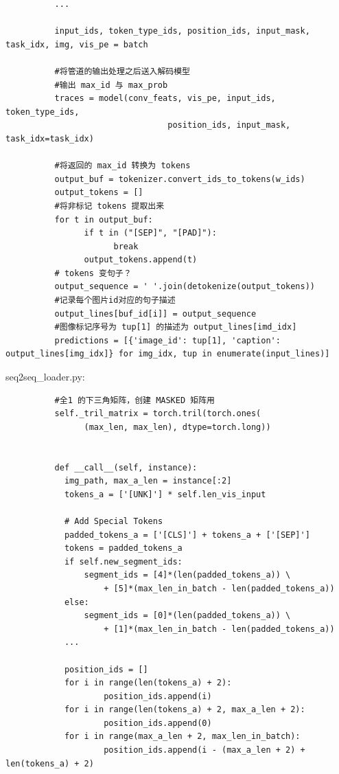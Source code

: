 \documentclass[a4paper]{article}
\begin{document}
\begin{sloppypar}
\begin{lstlisting}
          ...

          input_ids, token_type_ids, position_ids, input_mask, task_idx, img, vis_pe = batch

          #将管道的输出处理之后送入解码模型
          #输出 max_id 与 max_prob
          traces = model(conv_feats, vis_pe, input_ids, token_type_ids,
                                 position_ids, input_mask, task_idx=task_idx)
          
          #将返回的 max_id 转换为 tokens
          output_buf = tokenizer.convert_ids_to_tokens(w_ids)
          output_tokens = []
          #将非标记 tokens 提取出来
          for t in output_buf:
                if t in ("[SEP]", "[PAD]"):
                      break
                output_tokens.append(t)
          # tokens 变句子？
          output_sequence = ' '.join(detokenize(output_tokens))
          #记录每个图片id对应的句子描述
          output_lines[buf_id[i]] = output_sequence
          #图像标记序号为 tup[1] 的描述为 output_lines[imd_idx]
          predictions = [{'image_id': tup[1], 'caption': output_lines[img_idx]} for img_idx, tup in enumerate(input_lines)]
          \end{lstlisting}



    \newpage

    seq2seq\_loader.py:
    \begin{lstlisting}
          #全1 的下三角矩阵，创建 MASKED 矩阵用
          self._tril_matrix = torch.tril(torch.ones(
                (max_len, max_len), dtype=torch.long))

          
          def __call__(self, instance):
            img_path, max_a_len = instance[:2]
            tokens_a = ['[UNK]'] * self.len_vis_input
        
            # Add Special Tokens
            padded_tokens_a = ['[CLS]'] + tokens_a + ['[SEP]']
            tokens = padded_tokens_a
            if self.new_segment_ids:
                segment_ids = [4]*(len(padded_tokens_a)) \
                    + [5]*(max_len_in_batch - len(padded_tokens_a))
            else:
                segment_ids = [0]*(len(padded_tokens_a)) \
                    + [1]*(max_len_in_batch - len(padded_tokens_a))
            ...

            position_ids = []
            for i in range(len(tokens_a) + 2):
                    position_ids.append(i)
            for i in range(len(tokens_a) + 2, max_a_len + 2):
                    position_ids.append(0)
            for i in range(max_a_len + 2, max_len_in_batch):
                    position_ids.append(i - (max_a_len + 2) + len(tokens_a) + 2)
        

\end{lstlisting}
\end{sloppypar}
\end{document}
